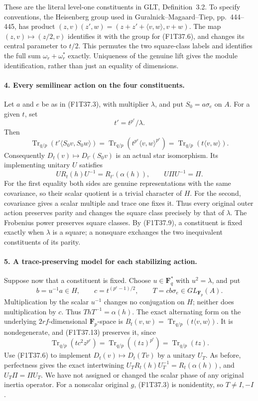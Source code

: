 These are the literal level-one constituents in GLT,
Definition~3.2. To specify conventions, the Heisenberg group
used in Guralnick--Magaard--Tiep, pp.~444--445, has product
\((z,v)(z',w)=(z+z'+\langle v,w\rangle,v+w)\).
The map \((z,v)\mapsto(z/2,v)\) identifies it with the
group for (F1T37.6), and changes its central parameter to
\(t/2\). This permutes the two square-class labels and
identifies the full sum \(\omega_r+\omega_r^*\) exactly.
Uniqueness of the genuine lift gives the module
identification, rather than just an equality of dimensions.

\paragraph{4. Every semilinear action on the four constituents.}
Let \(a\) and \(e\) be as in (F1T37.3), with multiplier
\(\lambda\), and put \(S_0=a\sigma_e\) on \(A\).
For a given \(t\), set
\[
                       t'=t^{p^e}/\lambda.
\tag{F1T37.10}
\]
Then
\[
 \operatorname{Tr}_{q/p}
       (t'\langle S_0v,S_0w\rangle)
 =\operatorname{Tr}_{q/p}
       (t^{p^e}\langle v,w\rangle^{p^e})
 =\operatorname{Tr}_{q/p}(t\langle v,w\rangle).
\tag{F1T37.11}
\]
Consequently \(D_t(v)\mapsto D_{t'}(S_0v)\) is an
actual star isomorphism. Its implementing unitary \(U\)
satisfies
\[
        U R_t(h)U^{-1}=R_{t'}(\alpha(h)),
        \qquad U\Pi U^{-1}=\Pi.
\tag{F1T37.12}
\]
For the first equality both sides are genuine
representations with the same covariance, so their scalar
quotient is a trivial character of \(H\). For the second,
covariance gives a scalar multiple and trace one fixes it.
Thus every original outer action preserves parity and
changes the square class precisely by that of \(\lambda\).
The Frobenius power preserves square classes. By
(F1T37.9), a constituent is fixed exactly when
\(\lambda\) is a square; a nonsquare exchanges the two
inequivalent constituents of its parity.

\paragraph{5. A trace-preserving model for each stabilizing action.}
Suppose now that a constituent is fixed. Choose
\(u\in\mathbf F_q^*\) with \(u^2=\lambda\), and put
\[
       b=u^{-1}a\in H,\qquad
       c=t^{(p^e-1)/2},\qquad
       T=c b\sigma_e\in GL_{\mathbf F_p}(A).
\tag{F1T37.13}
\]
Multiplication by the scalar \(u^{-1}\) changes no
conjugation on \(H\); neither does multiplication by
\(c\). Thus \(ThT^{-1}=\alpha(h)\).
The exact alternating form on the underlying
\(2rf\)-dimensional \(\mathbf F_p\)-space is
\(B_t(v,w)=\operatorname{Tr}_{q/p}(t\langle v,w\rangle)\).
It is nondegenerate, and (F1T37.13) preserves it, since
\[
 \operatorname{Tr}_{q/p}(t c^2 z^{p^e})
       =\operatorname{Tr}_{q/p}((tz)^{p^e})
       =\operatorname{Tr}_{q/p}(tz).
\tag{F1T37.14}
\]
Use (F1T37.6) to implement
\(D_t(v)\mapsto D_t(Tv)\) by a unitary \(U_T\).
As before, perfectness gives the exact intertwining
\(U_TR_t(h)U_T^{-1}=R_t(\alpha(h))\), and
\(U_T\Pi=\Pi U_T\). We have not assigned or changed
the scalar phase of any original inertia operator.
For a nonscalar original \(g\), (F1T37.3) is nonidentity,
so \(T\ne I,-I\).

